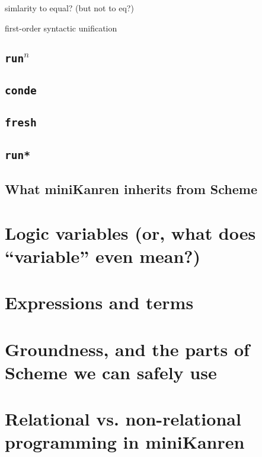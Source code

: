 \documentclass{book}
\begin{document}
simlarity to equal? (but not to eq?)

first-order syntactic unification

\subsection{\texttt{run}$^{n}$}

\subsection{\texttt{conde}}

\subsection{\texttt{fresh}}

\subsection{\texttt{run*}}

\subsection{What miniKanren inherits from Scheme}

\section{Logic variables (or, what does ``variable'' even mean?)}


\section{Expressions and terms}

\section{Groundness, and the parts of Scheme we can safely use}

\section{Relational vs. non-relational programming in miniKanren}
\end{document}
